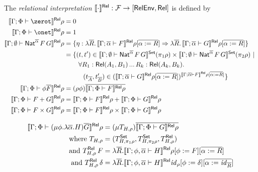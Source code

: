 \documentclass{lmcs}
\theoremstyle{plain}\newtheorem{satz}[thm]{Satz}
\newcommand{\F}{\mathcal{F}}
\newcommand{\set}{\mathsf{Set}}
\renewcommand{\id}{\mathit{id}}
\begin{document}
\begin{defi}\label{def:rel-sem}
The {\em relational interpretation} $\relsem{\cdot} : \F \to [\relenv,
 \rel]$ is defined by
\begin{align*}
  \relsem{\Gamma;\Phi \vdash \zerot}\rho &= 0\\
  \relsem{\Gamma;\Phi \vdash \onet}\rho &= 1\\
  \relsem{\Gamma; \emptyset \vdash \Nat^{\ol{\alpha}} \,F\,G}\rho &= \{\eta
  : \lambda \ol{R}.\,\relsem{\Gamma; \ol{\alpha} \vdash
    F}\rho[\ol{\alpha := R}] \Rightarrow \lambda \ol{R}. \,\relsem{
    \Gamma; \ol{\alpha} \vdash G}\rho[\ol{\alpha := R}]\}\\
  &=
  \{(t,t') \in \setsem{\Gamma; \emptyset
    \vdash \Nat^{\ol{\alpha}}
    \,F\,G} (\pi_1 \rho) \times \setsem{ 
    \Gamma;\emptyset
    \vdash \Nat^{\ol{\alpha}} \,F\,G} (\pi_2
  \rho)~|~\\ 
  & \hspace{0.3in} \forall {R_1 : \rel(A_1,B_1)}\,...\,{R_k : \rel(A_k,B_k)}.\\
  & \hspace{0.4in} (t_{\ol{A}},t'_{\ol{B}}) \in
  (\relsem{\Gamma; \ol{\alpha} \vdash G}\rho[\ol{\alpha :=
      R}])^{\relsem{\Gamma;\ol{\alpha}\vdash F}\rho[\ol{\alpha := R}]} \}\\  
  \relsem{\Gamma;\Phi \vdash \phi \ol{F}}\rho &=
  (\rho\phi)\ol{\relsem{\Gamma;\Phi \vdash 
    F}\rho}\\
  \relsem{\Gamma;\Phi \vdash F+G}\rho &=
  \relsem{\Gamma;\Phi \vdash F}\rho +
  \relsem{\Gamma;\Phi \vdash G}\rho\\
  \relsem{\Gamma;\Phi \vdash F\times G}\rho &=
  \relsem{\Gamma;\Phi \vdash F}\rho \times
  \relsem{\Gamma;\Phi \vdash G}\rho\\  
\end{align*}

\vspace*{-0.5in}

\begin{align*}
   \relsem{\Gamma;\Phi \vdash (\mu \phi.\lambda
    \ol{\alpha}. H)\ol{G}}\rho
  &= (\mu T_{H,\rho})\ol{\relsem{\Gamma;\Phi \vdash G}\rho}\\
  \text{where }	T_{H,\rho}
    &= (T^\set_{H,\pi_1\rho}, T^\set_{H,\pi_2\rho}, T^\rel_{H,\rho}) \\
  \text{and } T^\rel_{H,\rho}\,F
    &= \lambda \ol{R}. \relsem{
      \Gamma;\phi,\ol{\alpha} \vdash H}\rho[\phi :=
    F][\ol{\alpha := R}]\\
  \text{and } T^\rel_{H,\rho}\,\delta
    &= \lambda \ol{R}. \relsem{
      \Gamma;\phi,\ol{\alpha} \vdash H}\id_\rho[\phi :=
    \delta][\ol{\alpha := \id_{\ol{R}}}]
\end{align*}
\end{defi}
\end{document}
